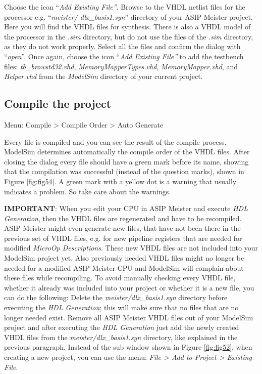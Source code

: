 Choose the icon ``\emph{Add Existing File''}. Browse to the VHDL netlist
files for the processor e.g. ``\emph{meister/ dlx\_basis1.syn}''
directory of your ASIP Meister project. Here you will find the VHDL
files for synthesis. There is also a VHDL model of the processor in the
\emph{.sim} directory, but do {not} use the files of the \emph{.sim}
directory, as they do not work properly. Select all the files and
confirm the dialog with ``\emph{open}''. Once again, choose the icon
``\emph{Add Existing File''} to add the testbench files:
\emph{tb\_browstd32.vhd}, \emph{MemoryMapperTypes.vhd},
\emph{MemoryMapper.vhd}, and \emph{Helper.vhd} from the \emph{ModelSim}
directory of your current project.

\hypertarget{compile-the-project}{%
\subsection{Compile the project}\label{compile-the-project}}

Menu: Compile \textgreater{} Compile Order \textgreater{} Auto Generate

Every file is compiled and you can see the result of the compile
process. ModelSim determines automatically the compile order of the VHDL
files. After closing the dialog every file should have a green mark
before its name, showing that the compilation was successful (instead of
the question marks), shown in Figure \ref{fig:fig54}. A
green mark with a yellow dot is a warning that usually indicates a
problem. So take care about the warnings.

\textbf{IMPORTANT}: When you edit your CPU in ASIP Meister and execute
\emph{HDL Generation}, then the VHDL files are regenerated and have to
be recompiled. ASIP Meister might even generate new files, that have not
been there in the previous set of VHDL files, e.g. for new pipeline
registers that are needed for modified \emph{MicroOp Descriptions}.
These new VHDL files are not included into your ModelSim project yet.
Also previously needed VHDL files might no longer be needed for a
modified ASIP Meister CPU and ModelSim will complain about these files
while recompiling. To avoid manually checking every VHDL file, whether
it already was included into your project or whether it is a new file,
you can do the following: Delete the \emph{meister/dlx\_basis1.syn}
directory before executing the \emph{HDL Generation}; this will make
sure that no files that are no longer needed exist. Remove all ASIP
Meister VHDL files out of your ModelSim project and after executing the
\emph{HDL Generation} just add the newly created VHDL files from the
\emph{meister/dlx\_basis1.syn} directory, like explained in the previous
paragraph. Instead of the sub window shown in Figure \ref{fig:fig52}, when creating a new project, you
can use the menu: \emph{File \textgreater{} Add to Project
\textgreater{} Existing File}.

